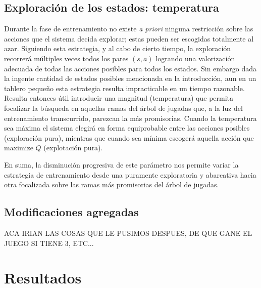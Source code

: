 \documentclass[11pt, spanish]{article}
\begin{document}
\subsection{Exploración de los estados: temperatura}

\par Durante la fase de entrenamiento no existe \emph{a priori} ninguna 
restricción sobre las acciones que el sistema decida explorar; estas pueden ser 
escogidas totalmente al azar. Siguiendo esta estrategia, y al cabo de 
cierto tiempo, la exploración recorrerá múltiples veces todos los pares 
$(s,a)$ logrando una valorización adecuada de todas las acciones posibles para 
todos los estados. Sin embargo dada la ingente cantidad de estados posibles 
mencionada en la introducción, aun en un tablero pequeño esta estrategia 
resulta impracticable en un tiempo razonable. Resulta entonces útil introducir 
una magnitud (temperatura) que permita focalizar la búsqueda en aquellas ramas 
del árbol de jugadas que, a la luz del entrenamiento transcurrido, parezcan la 
más promisorias. Cuando la temperatura sea máxima el sistema elegirá en forma 
equiprobable entre las acciones posibles (exploración pura), mientras que 
cuando sea mínima escogerá aquella acción que maximize $Q$ (explotación pura).
\par En suma, la disminución progresiva de este parámetro nos permite variar la 
estrategia de entrenamiento desde una puramente exploratoria y abarcativa hacia 
otra focalizada sobre las ramas más promisorias del árbol de jugadas.

\subsection{Modificaciones agregadas}
ACA IRIAN LAS COSAS QUE LE PUSIMOS DESPUES, DE QUE GANE EL JUEGO SI TIENE 3, ETC...

\section{Resultados}
\end{document}
